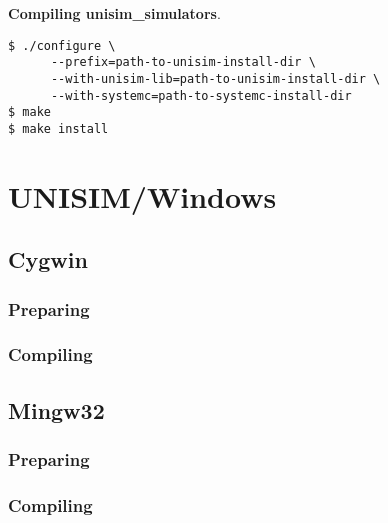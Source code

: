 \noindent \textbf{Compiling unisim\_simulators}.

\begin{verbatim}
$ ./configure \
      --prefix=path-to-unisim-install-dir \
      --with-unisim-lib=path-to-unisim-install-dir \
      --with-systemc=path-to-systemc-install-dir
$ make
$ make install
\end{verbatim}

\section{UNISIM/Windows}
\label{compiling_unisim_for_windows}

\subsection{Cygwin}
\label{compiling_unisim_for_cygwin}

\subsubsection{Preparing}

\subsubsection{Compiling}

\subsection{Mingw32}
\label{compiling_unisim_for_mingw32}

\subsubsection{Preparing}

\subsubsection{Compiling}
